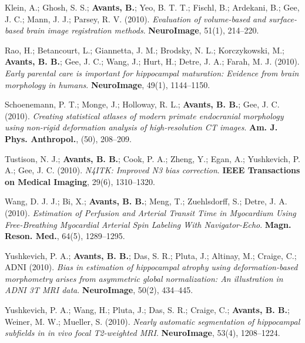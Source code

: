\documentclass[10pt,letterpaper]{article}
\begin{document}
\begin{enumerate}
{  \item Klein, A.; Ghosh, S. S.; \textbf{Avants, B.}; Yeo, B. T. T.; Fischl, B.; Ardekani, B.; Gee, J. C.; Mann, J. J.; Parsey, R. V. (2010). \textit{Evaluation of volume-based and surface-based brain image registration methods}. \textbf{NeuroImage}, 51(1), 214--220.
  \item Rao, H.; Betancourt, L.; Giannetta, J. M.; Brodsky, N. L.; Korczykowski, M.; \textbf{Avants, B. B.}; Gee, J. C.; Wang, J.; Hurt, H.; Detre, J. A.; Farah, M. J. (2010). \textit{Early parental care is important for hippocampal maturation: Evidence from brain morphology in humans}. \textbf{NeuroImage}, 49(1), 1144--1150.
  \item Schoenemann, P. T.; Monge, J.; Holloway, R. L.; \textbf{Avants, B. B.}; Gee, J. C. (2010). \textit{Creating statistical atlases of modern primate endocranial morphology using non-rigid deformation analysis of high-resolution CT images}. \textbf{Am. J. Phys. Anthropol.}, (50), 208--209.
  \item Tustison, N. J.; \textbf{Avants, B. B.}; Cook, P. A.; Zheng, Y.; Egan, A.; Yushkevich, P. A.; Gee, J. C. (2010). \textit{N4ITK: Improved N3 bias correction}. \textbf{IEEE Transactions on Medical Imaging}, 29(6), 1310--1320.
  \item Wang, D. J. J.; Bi, X.; \textbf{Avants, B. B.}; Meng, T.; Zuehlsdorff, S.; Detre, J. A. (2010). \textit{Estimation of Perfusion and Arterial Transit Time in Myocardium Using Free-Breathing Myocardial Arterial Spin Labeling With Navigator-Echo}. \textbf{Magn. Reson. Med.}, 64(5), 1289--1295.
  \item Yushkevich, P. A.; \textbf{Avants, B. B.}; Das, S. R.; Pluta, J.; Altinay, M.; Craige, C.; ADNI (2010). \textit{Bias in estimation of hippocampal atrophy using deformation-based morphometry arises from asymmetric global normalization: An illustration in ADNI 3T MRI data}. \textbf{NeuroImage}, 50(2), 434--445.
  \item Yushkevich, P. A.; Wang, H.; Pluta, J.; Das, S. R.; Craige, C.; \textbf{Avants, B. B.}; Weiner, M. W.; Mueller, S. (2010). \textit{Nearly automatic segmentation of hippocampal subfields in in vivo focal T2-weighted MRI}. \textbf{NeuroImage}, 53(4), 1208--1224.

}
\end{enumerate}
\end{document}
